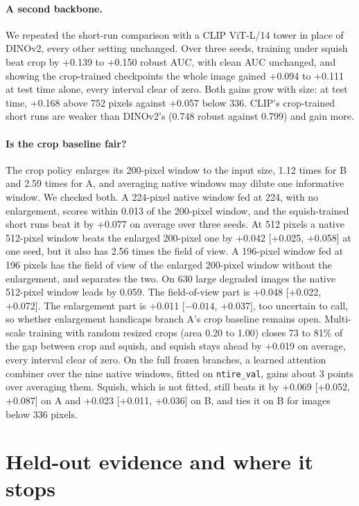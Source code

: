 \documentclass[letterpaper]{article} %
\begin{document}
\paragraph{A second backbone.} We repeated the short-run comparison with a CLIP
ViT-L/14 tower \cite{radford2021clip} in place of DINOv2, every other setting
unchanged. Over three seeds, training under squish beat crop by +0.139 to
+0.150 robust AUC, with clean AUC unchanged, and showing the crop-trained
checkpoints the whole image gained +0.094 to +0.111 at test time alone, every
interval clear of zero. Both gains grow with size: at test time, +0.168 above
752 pixels against +0.057 below 336. CLIP's crop-trained short runs are weaker
than DINOv2's (0.748 robust against 0.799) and gain more.

\paragraph{Is the crop baseline fair?} The crop policy enlarges its
200-pixel window to the input size, 1.12 times for B and 2.59 times for A,
and averaging native windows may dilute one informative window. We checked
both. A 224-pixel native window fed at 224, with no enlargement, scores
within 0.013 of the 200-pixel window, and the squish-trained short runs beat it
by +0.077 on average over three seeds. At 512 pixels a native 512-pixel
window beats the enlarged 200-pixel one by +0.042 [+0.025, +0.058] at one
seed, but it also has 2.56 times the field of view. A 196-pixel window
fed at 196 pixels has the field of view of the enlarged 200-pixel window
without the enlargement, and separates the two. On 630 large degraded images
the native 512-pixel window leads by 0.059. The field-of-view part is +0.048
[+0.022, +0.072]. The enlargement part is +0.011 [$-0.014$, +0.037], too
uncertain to call, so whether enlargement handicaps branch A's crop baseline
remains open.
Multi-scale training with random resized crops (area 0.20 to 1.00) closes 73
to 81\% of the gap between crop and squish, and squish stays ahead by +0.019
on average, every interval clear of zero. On the full frozen branches, a
learned attention combiner over the nine native windows, fitted on
\texttt{ntire\_val}, gains about 3 points over averaging them. Squish, which
is not fitted, still beats it by +0.069 [+0.052, +0.087] on A and +0.023
[+0.011, +0.036] on B, and ties it on B for images below 336 pixels.

\section{Held-out evidence and where it stops}
\label{sec:heldout}
\end{document}
